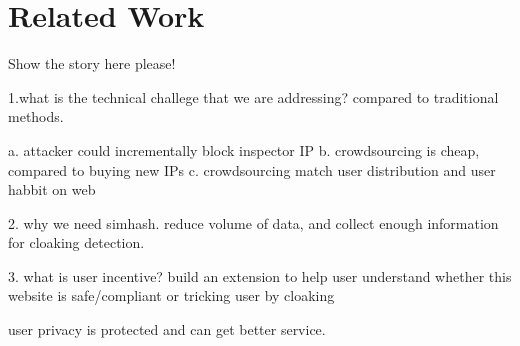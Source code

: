 \section{Related Work}

Show the story here please!

1.what is the technical challege that we are addressing? compared to traditional
methods.

a. attacker could incrementally block inspector IP
b. crowdsourcing is cheap, compared to buying new IPs
c. crowdsourcing match user distribution and user habbit on web


2. why we need simhash.
reduce volume of data, and collect enough information for cloaking detection.


3. what is user incentive?
build an extension to help user understand whether this website is
safe/compliant or tricking user by cloaking

user privacy is protected and can get better service.

